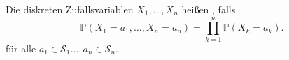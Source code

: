 \begin{definition}[Unabhängigkeit]\label{def:unabhängigkeit}
    Die diskreten Zufallsvariablen $X_1,\ldots,X_n$ heißen , falls
    \[
        \mathbb{P}(X_1=a_1,\ldots,X_n = a_n) = \prod_{k=1}^n \mathbb{P}(X_k = a_k)
    .\]
    für alle $a_1\in \mathcal{S}_1\ldots,a_n \in \mathcal{S}_n$.
\end{definition}
